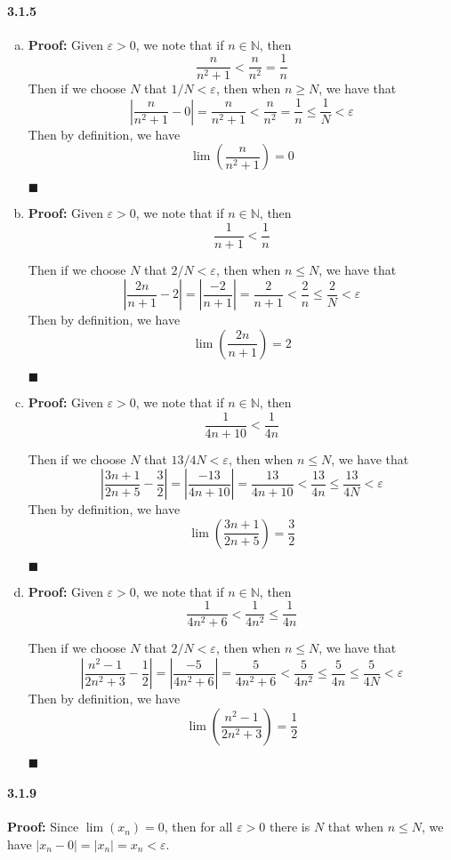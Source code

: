 \documentclass[11pt]{article}
\newcommand{\qed}{
	\begin{flushright}
		$\blacksquare$
	\end{flushright}		
}
\begin{document}
	\paragraph{3.1.5}
		\begin{enumerate}[(a)]
			\item \textbf{Proof:}
				Given $\varepsilon > 0$, we note that if $n \in \mathbb{N}$, then
						\[\frac{n}{n^2 + 1} < \frac{n}{n^2} = \frac{1}{n}\]
				Then if we choose $N$ that $1/N < \varepsilon$, then when $n \geq N$, we have that
						\[\left| \frac{n}{n^2 + 1} - 0\right| = \frac{n}{n^2 + 1} < \frac{n}{n^2} = \frac{1}{n} \leq \frac{1}{N} < \varepsilon\]
				Then by definition, we have 
					\[\lim \left(\frac{n}{n^2 + 1}\right) = 0\]
				\qed
			\item \textbf{Proof:}
				Given $\varepsilon > 0$, we note that if $n \in \mathbb{N}$, then
						\[\frac{1}{n + 1} < \frac{1}{n}\]
						
				Then if we choose $N$ that $2/N < \varepsilon$, then when $n \leq N$, we have that
						\[\left| \frac{2n}{n + 1} - 2\right| = \left| \frac{-2}{n + 1}\right| = \frac{2}{n + 1} < \frac{2}{n} \leq \frac{2}{N} < \varepsilon\]
				Then by definition, we have
					\[\lim \left(\frac{2n}{n + 1}\right) = 2\]
					\qed
			\item \textbf{Proof:}
				Given $\varepsilon > 0$, we note that if $n \in \mathbb{N}$, then
						\[\frac{1}{4n + 10} < \frac{1}{4n}\]
						
				Then if we choose $N$ that $13/4N < \varepsilon$, then when $n \leq N$, we have that
						\[\left| \frac{3n + 1}{2n + 5} - \frac{3}{2}\right| = \left| \frac{-13}{4n + 10}\right| = \frac{13}{4n + 10} < \frac{13}{4n} \leq \frac{13}{4N} < \varepsilon\]
				Then by definition, we have
					\[\lim \left(\frac{3n + 1}{2n + 5}\right) = \frac{3}{2}\]
					\qed
			\item \textbf{Proof:}
				Given $\varepsilon > 0$, we note that if $n \in \mathbb{N}$, then
						\[\frac{1}{4n^2 + 6} < \frac{1}{4n^2} \leq \frac{1}{4n} \]
						
				Then if we choose $N$ that $2/N < \varepsilon$, then when $n \leq N$, we have that
						\[\left| \frac{n^2 - 1}{2n^2 + 3} - \frac{1}{2}\right| = \left| \frac{-5}{4n^2 + 6}\right| = \frac{5}{4n^2 + 6} < \frac{5}{4n^2} \leq \frac{5}{4n} \leq \frac{5}{4N} < \varepsilon\]
				Then by definition, we have
					\[\lim \left(\frac{n^2 - 1}{2n^2 + 3}\right) = \frac{1}{2}\]
					\qed
		\end{enumerate}
	\paragraph{3.1.9}\textbf{Proof:}
		Since $\lim (x_n) = 0$, then for all $\varepsilon > 0$ there is $N$ that when $n \leq N$, we have $\left|x_n - 0 \right| = |x_n| = x_n < \varepsilon$. 
		
\end{document}
